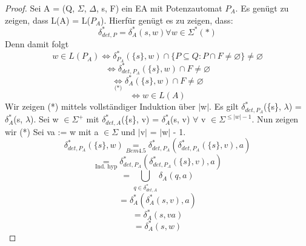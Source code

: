 \begin{proof}
    Sei A = (Q, $\Sigma$, $\Delta$, s, F) ein EA mit Potenzautomat $P_{A}$. Es genügt zu zeigen, dass L(A) = L($P_{A}$). Hierfür genügt es zu zeigen, dass:
    \[\delta_{det,P}^{*} = \delta_{A}^{*}(s, w) \forall w \in \Sigma^{*} (*)\]
    Denn damit folgt
    \[w \in  L (P_{A}) \Leftrightarrow \delta_{P_{A}}^{*}(\{s\}, w) \cap \{P\subseteq Q : P\cap F \neq \varnothing \} \neq \varnothing \] 
    \[\Leftrightarrow \delta_{det, P_{A}}^{*}(\{s\}, w) \cap F \neq \varnothing \]
    \[\underset{\text{(*)}}{\Leftrightarrow } \delta_{A}^{*}(\{s\}, w) \cap F \neq \varnothing \]
    \[\Leftrightarrow w \in L(A)\] Wir zeigen (*) mittels vollständiger Induktion über $\lvert$w$\rvert$. Es gilt $\delta_{det, P_{A}}^{*}$(\{s\}, $\lambda$) = $\delta_{A}^{*}$(s, $\lambda$). Sei w $\in \Sigma^{+}$ mit $\delta_{det, A}^{*}$(\{s\}, v) = $\delta_{A}^{*}$(s, v) $\forall$ v $\in \Sigma^{\leq \lvert w \rvert - 1}$. Nun zeigen wir (*) Sei va := w mit a $\in \Sigma$ und $\lvert$v$\rvert$ = $\lvert$w$\rvert$ - 1.
    \[\delta_{det, P_{A}}^{*} (\{s\}, w) \underset{\hyperref[subsec:4.5]{Bem 4.5}}{=} \delta_{det, P_{A}}^{*} (\delta_{det, P_{A}}^{*}(\{s\}, v), a)\]
    \[\underset{\text{Ind. hyp}}{=} \delta_{det, P_{A}}^{*}(\delta_{det, P_{A}}^{*}(\{s\}, v), a)\]
    \[ = \bigcup \limits_{q \in \delta_{det, A}^{*}}\delta_{A}(q, a)\]
    \[ = \delta_{A}^{*}(\delta_{A}^{*}(s, v), a)\]
    \[ = \delta_{A}^{*}(s, va)\]
    \[ = \delta_{A}^{*}(s, w)\]
\end{proof}